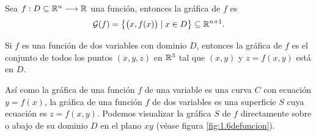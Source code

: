 
\begin{definition}
    Sea $f:D \subseteq \RR[n] \longrightarrow \RR$ una función, entonces la gráfica de $f$ es
    $$\mathcal{G}(f) = \left\{ \big(x, f(x)\big) \mid x \in D \right\} \subseteq \RR[n+1].$$
\end{definition}

\begin{observation}
    Si $f$ es una función de dos variables con dominio $D$, entonces la gráfica de $f$ es el conjunto de todos los puntos $(x, y, z)$ en $\RR[3]$ tal que $(x, y)$ y $z = f(x, y)$ está en $D$.
\end{observation}

Así como la gráfica de una función $f$ de una variable es una curva $C$ con ecuación $y = f (x)$, la gráfica de una función $f$ de dos variables es una superficie $S$ cuya ecuación es $z = f (x, y)$. Podemos visualizar la gráfica $S$ de $f$ directamente sobre o abajo de su dominio $D$ en el plano $xy$ (véase figura \ref{fig:1.6defuncion}).

